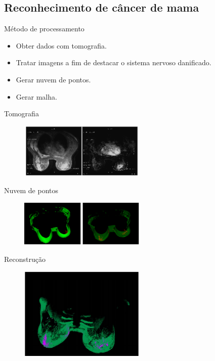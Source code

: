 \documentclass{beamer}
\begin{document}
\subsection{Reconhecimento de câncer de mama}

\begin{frame}{Método de processamento}
  \begin{itemize}
  \item {
    Obter dados com tomografia.
  }
  \item {
   Tratar imagens a fim de destacar o sistema nervoso danificado.
  }
  \item {
    Gerar nuvem de pontos.
  }
  \item {
   Gerar malha.
  }
  \end{itemize}
\end{frame}

\begin{frame}{Tomografia}
    \begin{figure}[htb]
    \label{fig:contraste}
    \includegraphics[width=6cm]{./img/contraste.png}
    \centering
    \end{figure}
\end{frame}

\begin{frame}{Nuvem de pontos}
    \begin{figure}[htb]
    \label{fig:reconstrucao}
    \includegraphics[width=6cm]{./img/reconstrucao.png}
    \centering
    \end{figure}
\end{frame}

\begin{frame}{Reconstrução}
    \begin{figure}[htb]
    \label{fig:final}
    \includegraphics[width=6cm]{./img/final.png}
    \centering
    \end{figure}
\end{frame}
\end{document}
